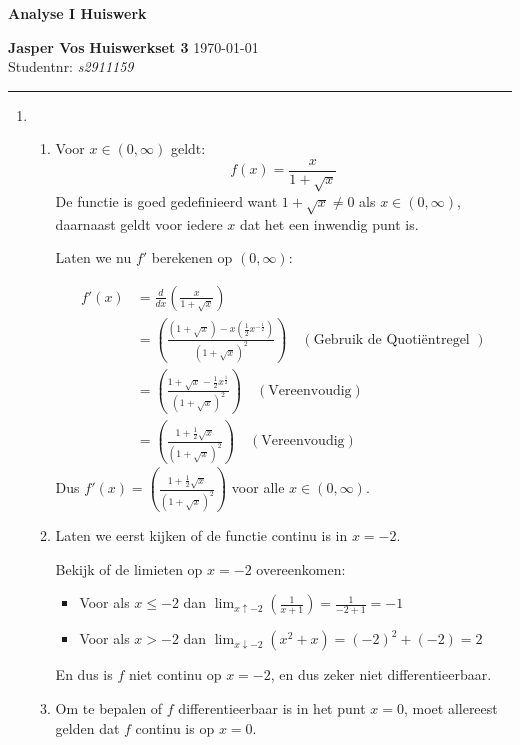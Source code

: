\documentclass{article}
\newcommand{\f}[2]{\frac{#1}{#2}}
\newcommand{\s}[1]{\sqrt{#1}}
\renewcommand{\l}{\left}
\renewcommand{\r}{\right}
\begin{document}
{\Large \textbf{Analyse I Huiswerk}}

\bigskip

\textbf{Jasper Vos} \hfill \textbf{Huiswerkset 3} \hfill \today \\
Studentnr: \emph{s2911159}

\rule{\textwidth}{2pt}

\bigskip

\begin{enumerate}[label=\arabic*)]
    \item
          \begin{enumerate}[label=\alph*)]
              \item Voor $x \in (0, \infty)$ geldt:
                    \[f(x) = \f{x}{1+\s{x}}\]
                    De functie is goed gedefinieerd want
                    $1+\s{x} \neq 0 $ als $x \in (0, \infty)$,
                    daarnaast geldt voor iedere $x$ dat het
                    een inwendig punt is.

                    Laten we nu $f'$
                    berekenen op $(0, \infty)$:

                    \begin{align*}
                        f'(x) & = \f{d}{dx}\l(\f{x}{1+\s{x}}\r)                                                   \\
                              & = \l(\f{(1+\s{x})-x(\f{1}{2}x^{-\f{1}{2}})}{(1+\s{x})^2}\r)
                        \quad (\text{Gebruik de Quotiëntregel
                        })                                                                                        \\
                              & = \l(\f{1+\s{x}-\f{1}{2}x^{\f{1}{2}}}{(1+\s{x})^2}\r) \quad (\text{Vereenvoudig}) \\
                              & = \boxed{\l(\f{1+\f{1}{2}\s{x}}{(1+\s{x})^2}\r)} \quad (\text{Vereenvoudig})
                    \end{align*}
                    Dus $f'(x) = \l(\f{1+\f{1}{2}\s{x}}{(1+\s{x})^2}\r)$ voor alle $x \in (0, \infty)$.
              \item Laten we eerst kijken of de functie continu is in $x = -2$.

                    Bekijk of de limieten op $x = -2$ overeenkomen:
                    \begin{itemize}
                        \item Voor als $x \leq -2$ dan $\lim_{x\uparrow-2} (\f{1}{x+1}) = \f{1}{-2 + 1}=\boxed{-1}$
                        \item Voor als $x > -2$ dan $\lim_{x\downarrow -2} (x^2 + x) = (-2)^2 + (-2) = \boxed{2}$
                    \end{itemize}
                    En dus is $f$ niet continu op $x = -2$, en dus zeker niet differentieerbaar.
              \item Om te bepalen of $f$ differentieerbaar is in
                    het punt $x=0$, moet allereest gelden dat $f$ continu is op $x=0$.


\end{enumerate}
\end{enumerate}
\end{document}
